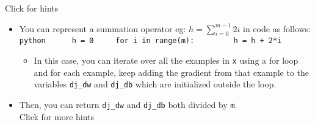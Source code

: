\documentclass[11pt]{article}
\providecommand{\tightlist}{%
      \setlength{\itemsep}{0pt}\setlength{\parskip}{0pt}}
\begin{document}
    Click for hints

\begin{itemize}
\item
  You can represent a summation operator eg:
  \(h = \sum\limits_{i = 0}^{m-1} 2i\) in code as follows:
  \texttt{python\ \ \ \ \ \ h\ =\ 0\ \ \ \ \ for\ i\ in\ range(m):\ \ \ \ \ \ \ \ \ h\ =\ h\ +\ 2*i}

  \begin{itemize}
  \tightlist
  \item
    In this case, you can iterate over all the examples in \texttt{x}
    using a for loop and for each example, keep adding the gradient from
    that example to the variables \texttt{dj\_dw} and \texttt{dj\_db}
    which are initialized outside the loop.
  \end{itemize}
\item
  Then, you can return \texttt{dj\_dw} and \texttt{dj\_db} both divided
  by \texttt{m}.\\

  Click for more hints
\end{itemize}
\end{document}
